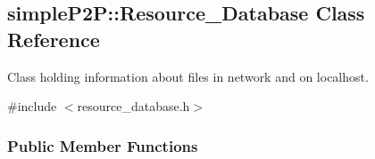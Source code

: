 \hypertarget{classsimpleP2P_1_1Resource__Database}{}\subsection{simple\+P2P\+:\+:Resource\+\_\+\+Database Class Reference}
\label{classsimpleP2P_1_1Resource__Database}


Class holding information about files in network and on localhost.  




{\ttfamily \#include $<$resource\+\_\+database.\+h$>$}

\subsubsection*{Public Member Functions}
